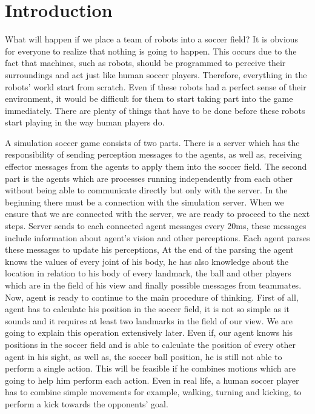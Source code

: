 \chapter{Introduction}
\label{intro}
What will happen if we place a team of robots into a soccer field? It is obvious for everyone to realize that nothing is going to happen. This occurs due to the fact that machines, such as robots, should be programmed to perceive their surroundings and act just like human soccer players. Therefore, everything in the robots' world start from scratch. Even if these robots had a perfect sense of their environment, it would be difficult for them to start taking part into the game immediately. There are plenty of things that have to be done before these robots start playing in the way human players do.
 
A simulation soccer game consists of two parts. There is a server which has the responsibility of sending perception messages to the agents, as well as, receiving effector messages from the agents to apply them into the soccer field. The second part is the agents which are processes running independently from each other without being able to communicate directly but only with the server.
In the beginning there must be a connection with the simulation server. When we ensure that we are connected with the server, we are ready to proceed to the next steps.
Server sends to each connected agent messages every 20ms, these messages include information about agent's vision and other perceptions. Each agent parses these messages to update his perceptions, At the end of the parsing the agent knows the values of every joint of his body,  he has also knowledge about the location in relation to his body of every landmark, the ball and other players which are in the field of his view and finally possible messages from teammates. Now, agent is ready to continue to the main procedure of thinking.
First of all, agent has to calculate his position in the soccer field, it is not so simple as it sounds and it requires at least two landmarks in the field of our view. We are going to explain this operation extensively later.
Even if, our agent knows his positions in the soccer field and is able to calculate the position of every other agent in his sight, as well as, the soccer ball position, he is still not able to perform a single action. 
This will be feasible if he combines motions which are going to help him perform each action. 
Even in real life, a human soccer player has to combine simple movements for example, walking, turning and kicking, to perform a kick towards the opponents' goal. 
